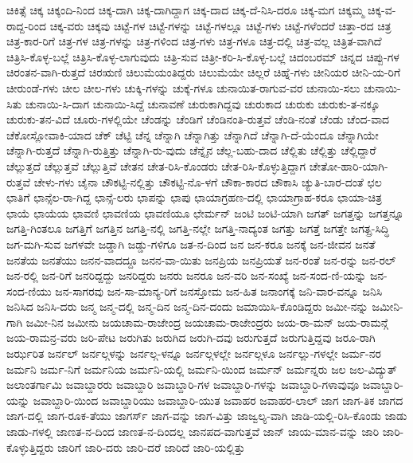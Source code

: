 {ಚಿಕಿತ್ಸೆ
ಚಿಕ್ಕ
ಚಿಕ್ಕಂದಿ-ನಿಂದ
ಚಿಕ್ಕ-ದಾಗಿ
ಚಿಕ್ಕ-ದಾಗಿದ್ದಾಗ
ಚಿಕ್ಕ-ದಾದ
ಚಿಕ್ಕ-ದೆ-ನಿಸಿ-ದರೂ
ಚಿಕ್ಕ-ಮಗ
ಚಿಕ್ಕಮ್ಮ
ಚಿಕ್ಕ-ವ-ರಾದ್ದ-ರಿಂದ
ಚಿಕ್ಕ-ವರು
ಚಿಕ್ಕವು
ಚಿಟ್ಟೆ-ಗಳ
ಚಿಟ್ಟೆ-ಗಳನ್ನು
ಚಿಟ್ಟೆ-ಗಳಲ್ಲೂ
ಚಿಟ್ಟೆ-ಗಳು
ಚಿಟ್ಟೆ-ಗಳೆಂದರೆ
ಚಿತ್ತಾ-ರದ
ಚಿತ್ರ
ಚಿತ್ರ-ಕಾರ-ರಿಗೆ
ಚಿತ್ರ-ಗಳ
ಚಿತ್ರ-ಗಳನ್ನು
ಚಿತ್ರ-ಗಳಿಂದ
ಚಿತ್ರ-ಗಳು
ಚಿತ್ರ-ಗಳೂ
ಚಿತ್ರ-ದಲ್ಲಿ
ಚಿತ್ರ-ವಲ್ಲ
ಚಿತ್ರಿತ-ವಾಗಿದೆ
ಚಿತ್ರಿಸಿ-ಕೊಳ್ಳ-ಬಲ್ಲೆ
ಚಿತ್ರಿಸಿ-ಕೊಳ್ಳ-ಲಾಗುವುದು
ಚಿತ್ರಿ-ಸುವ
ಚಿತ್ರೀ-ಕರಿ-ಸಿ-ಕೊಳ್ಳ-ಬಲ್ಲೆ
ಚಿದಂಬರಮ್
ಚಿನ್ನದ
ಚಿಪ್ಪು-ಗಳ
ಚಿರಂತನ-ವಾಗಿ-ರುತ್ತದೆ
ಚಿರಋಣಿ
ಚಿಲುಮೆಯಂತಿದ್ದರು
ಚಿಲುಮೆಯೇ
ಚಿಲ್ಲರೆ
ಚಿಹ್ನೆ-ಗಳು
ಚೀನಿಯರ
ಚೀನಿ-ಯ-ರಿಗೆ
ಚೀರುಂಡೆ-ಗಳು
ಚೀಲ
ಚೀಲ-ಗಳು
ಚುಕ್ಕಿ-ಗಳನ್ನು
ಚುಕ್ಕೆ-ಗಳೂ
ಚುನಾಯಿತ-ರಾಗುವ-ವರ
ಚುನಾಯಿ-ಸಲು
ಚುನಾಯಿ-ಸಿತು
ಚುನಾಯಿ-ಸಿ-ದಾಗ
ಚುನಾಯಿ-ಸಿದ್ದೆ
ಚುನಾವಣೆ
ಚುರುಕಾಗಿದ್ದವು
ಚುರುಕಾದ
ಚುರುಕು
ಚುರುಕು-ತ-ನಕ್ಕೂ
ಚುರುಕು-ತನ-ವಿದೆ
ಚೂರು-ಗಳಲ್ಲಿಯೇ
ಚೆಂಡನ್ನು
ಚೆಂಡಿಗೆ
ಚೆಂಡಿನಂತಿ-ರುತ್ತವೆ
ಚೆಂಡಿ-ನಂತೆ
ಚೆಂಡು
ಚೆಂದ-ವಾದ
ಚೆಕೋಸ್ಲೋವಾಕಿ-ಯಾದ
ಚೆಕ್
ಚೆಟ್ಟಿ
ಚೆನ್ನ
ಚೆನ್ನಾಗಿ
ಚೆನ್ನಾಗಿತ್ತು
ಚೆನ್ನಾಗಿದೆ
ಚೆನ್ನಾಗಿ-ದೆ-ಯೆಂದೂ
ಚೆನ್ನಾಗಿಯೇ
ಚೆನ್ನಾಗಿ-ರುತ್ತದೆ
ಚೆನ್ನಾಗಿ-ರುತ್ತಿತ್ತು
ಚೆನ್ನಾಗಿ-ರು-ವುದು
ಚೆನ್ನೈನ
ಚೆಲ್ಲ-ಬಹು-ದಾದ
ಚೆಲ್ಲಿತು
ಚೆಲ್ಲಿತ್ತು
ಚೆಲ್ಲಿದ್ದಾರೆ
ಚೆಲ್ಲುತ್ತದೆ
ಚೆಲ್ಲುತ್ತವೆ
ಚೆಲ್ಲುತ್ತಿವೆ
ಚೇತನ
ಚೇತ-ರಿಸಿ-ಕೊಂಡರು
ಚೇತ-ರಿಸಿ-ಕೊಳ್ಳುತ್ತಿದ್ದಾಗ
ಚೇತೋ-ಹಾರಿ-ಯಾಗಿ-ರುತ್ತವೆ
ಚೇಳು-ಗಳು
ಚೈನಾ
ಚೌಕಟ್ಟಿ-ನಲ್ಲಿತ್ತು
ಚೌಕಟ್ಟಿ-ನೊ-ಳಗೆ
ಚೌಕಾ-ಕಾರದ
ಚೌಕಾಸಿ
ಚ್ಯುತಿ-ಬಾರ-ದಂತೆ
ಛಲ
ಛಾತಿಗೆ
ಛಾನ್ಸೆಲ-ರಾ-ಗಿದ್ದ
ಛಾನ್ಸೆ-ಲರು
ಛಾಪನ್ನು
ಛಾಪು
ಛಾಯಾಗ್ರಹಣ-ದಲ್ಲಿ
ಛಾಯಾಗ್ರಾಹ-ಕರೂ
ಛಾಯಾ-ಚಿತ್ರ
ಛಾಯೆ
ಛಾಯೆಯ
ಛಾವಣಿ
ಛಾವಣಿಯ
ಛಾವಣಿಯೂ
ಛೇರ್ಮನ್
ಜಂಟಿ
ಜಂಟಿ-ಯಾಗಿ
ಜಗತ್
ಜಗತ್ತನ್ನು
ಜಗತ್ತನ್ನೂ
ಜಗತ್ತಿ-ಗಿಂತಲೂ
ಜಗತ್ತಿಗೆ
ಜಗತ್ತಿನ
ಜಗತ್ತಿ-ನಲ್ಲಿ
ಜಗತ್ತಿ-ನಲ್ಲೇ
ಜಗತ್ತಿ-ನಾದ್ಯಂತ
ಜಗತ್ತು
ಜಗತ್ತೆ
ಜಗತ್ತೇ
ಜಗತ್ಪ್ರ-ಸಿದ್ಧಿ
ಜಗ-ಮಗಿ-ಸುವ
ಜಗಳವೇ
ಜಡ್ಡಾಗಿ
ಜಡ್ಡು-ಗಳಿಗೂ
ಜತ-ನ-ದಿಂದ
ಜನ
ಜನ-ಕರೂ
ಜನಕ್ಕೆ
ಜನ-ಜೀವನ
ಜನತೆ
ಜನತೆಯ
ಜನತೆಯು
ಜನನ-ವಾದದ್ದೂ
ಜನನ-ವಾ-ಯಿತು
ಜನಪ್ರಿಯ
ಜನಪ್ರಿಯತೆ
ಜನ-ರಂತೆ
ಜನ-ರನ್ನು
ಜನ-ರಲ್
ಜನ-ರಲ್ಲಿ
ಜನ-ರಿಗೆ
ಜನರಿದ್ದದ್ದು
ಜನರಿದ್ದರು
ಜನರು
ಜನರೂ
ಜನ-ವರಿ
ಜನ-ಸಂಖ್ಯೆ
ಜನ-ಸಂದ-ಣಿ-ಯನ್ನು
ಜನ-ಸಂದ-ಣಿಯು
ಜನ-ಸಾಗರವು
ಜನ-ಸಾ-ಮಾನ್ಯ-ರಿಗೆ
ಜನಸ್ತೋಮ
ಜನ-ಹಿತ
ಜನಾಂಗಕ್ಕೆ
ಜನಿ-ವಾರ-ವನ್ನೂ
ಜನಿಸಿ
ಜನಿಸಿದ
ಜನಿಸಿ-ದರು
ಜನ್ಮ
ಜನ್ಮ-ದಲ್ಲಿ
ಜನ್ಮ-ದಿನ
ಜನ್ಮ-ದಿನ-ದಂದು
ಜಮಾಯಿಸಿ-ಕೊಂಡಿದ್ದರು
ಜಮೀ-ನನ್ನು
ಜಮೀನಿ-ಗಾಗಿ
ಜಮೀ-ನಿನ
ಜಮೀನು
ಜಯಚಾಮ-ರಾಜೇಂದ್ರ
ಜಯಚಾಮ-ರಾಜೇಂದ್ರರು
ಜಯ-ರಾ-ಮನ್
ಜಯ-ರಾಮನ್ಗೆ
ಜಯ-ರಾಮನ್ರ-ವರು
ಜರಿ-ಪೇಟ
ಜರುಗಿತು
ಜರುಗಿದ
ಜರುಗಿ-ದವು
ಜರುಗುತ್ತದೆ
ಜರುಗುತ್ತಿದ್ದವು
ಜರೂ-ರಾಗಿ
ಜರ್ಝರಿತ
ಜರ್ನಲ್
ಜರ್ನಲ್ಗಳನ್ನು
ಜರ್ನಲ್ಗ-ಳನ್ನೂ
ಜರ್ನಲ್ಗಳಲ್ಲೇ
ಜರ್ನಲ್ಗಳೂ
ಜರ್ನಲ್ಲು-ಗಳಲ್ಲೇ
ಜರ್ಮ-ನರ
ಜರ್ಮನಿ
ಜರ್ಮ-ನಿಗೆ
ಜರ್ಮನಿಯ
ಜರ್ಮನಿ-ಯಲ್ಲಿ
ಜರ್ಮನಿ-ಯಿಂದ
ಜರ್ಮನ್
ಜರ್ಮನ್ನರು
ಜಲ
ಜಲ-ವಿದ್ಯುತ್
ಜಲಾಂತರ್ಗಾಮಿ
ಜವಾಬ್ದಾರರು
ಜವಾಬ್ದಾರಿ
ಜವಾಬ್ದಾರಿ-ಗಳ
ಜವಾಬ್ದಾರಿ-ಗಳನ್ನು
ಜವಾಬ್ದಾರಿ-ಗಳಾವುವೂ
ಜವಾಬ್ದಾರಿ-ಯನ್ನು
ಜವಾಬ್ದಾರಿ-ಯಿಂದ
ಜವಾಬ್ದಾರಿಯು
ಜವಾಬ್ದಾರಿ-ಯುತ
ಜವಾಹರ
ಜವಾಹರ-ಲಾಲ್
ಜಾಗ
ಜಾಗ-ತಿಕ
ಜಾಗದ
ಜಾಗ-ದಲ್ಲಿ
ಜಾಗ-ರೂಕ-ತೆಯು
ಜಾಗರ್ಸ್
ಜಾಗ-ವನ್ನು
ಜಾಗ-ವಿತ್ತು
ಜಾಜ್ವಲ್ಯ-ವಾಗಿ
ಜಾಡಿ-ಯಲ್ಲಿ-ರಿಸಿ-ಕೊಂಡು
ಜಾಡು
ಜಾಡು-ಗಳಲ್ಲಿ
ಜಾಣತ-ನ-ದಿಂದ
ಜಾಣತ-ನ-ದಿಂದಲ್ಲ
ಜಾನಪದ-ವಾಗುತ್ತವೆ
ಜಾನ್
ಜಾಯ-ಮಾನ-ವನ್ನು
ಜಾರಿ
ಜಾರಿ-ಕೊಳ್ಳುತ್ತಿದ್ದರು
ಜಾರಿಗೆ
ಜಾರಿ-ದರು
ಜಾರಿ-ದರೆ
ಜಾರಿದೆ
ಜಾರಿ-ಯಲ್ಲಿತ್ತು
}
